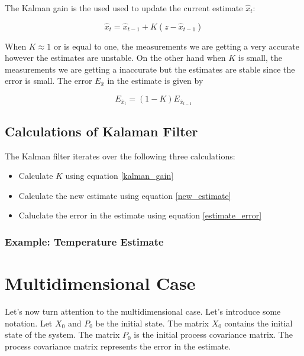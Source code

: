 The Kalman gain is the used used to update the current estimate $\hat{x}_t$:

\begin{equation}
\hat{x}_t = \hat{x}_{t-1} + K (z - \hat{x}_{t-1})
\label{new_estimate}
\end{equation} 


When $K \approx 1$ or is equal to one, the measurements we are getting a very accurate however the estimates are unstable. On the other hand when $K$ is small, 
the measurements we are getting a inaccurate but the estimates are stable since the error is small.
The error $E_{\hat{x}}$ in the estimate is given by 

\begin{equation}
E_{\hat{x}_t} = (1-K)E_{\hat{x}_{t-1}}
\label{estimate_error}
\end{equation}

\subsection{Calculations of Kalaman Filter}
The Kalman filter iterates over the following three calculations:

\begin{itemize}
\item Calculate $K$ using equation \ref{kalman_gain}
\item Calculate the new estimate using equation \ref{new_estimate} 
\item Caluclate the error in the estimate using equation \ref{estimate_error}
\end{itemize}

\subsubsection{Example: Temperature Estimate}


\section{Multidimensional Case}

Let's now turn attention to the multidimensional case. Let's introduce some notation. Let $X_0$ and $P_0$ be the initial state.
The matrix $X_0$ contains the initial state of the system. The matrix $P_0$ is the initial process covariance matrix. The process
covariance matrix represents the error in the estimate.


